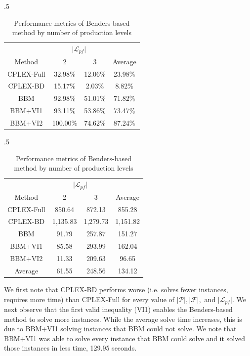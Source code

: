 \documentclass[12pt]{article}
\theoremstyle{thmstylethree}%
\begin{document}
\begin{table}[htp]
\begin{subtable}[c]{.5\textwidth}
\tiny
\centering
\begin{tabular}{|c|c|c|c|}
\hline
& \multicolumn{2}{c|}{$\vert \mathcal{L}_{pf} \vert$} &  \\
 Method & 2 & 3  & Average\\
 \hline
CPLEX-Full & 32.98\% & 12.06\% & 23.98\% \\
CPLEX-BD & 15.17\% & 2.03\% & 8.82\% \\
BBM & 92.98\% & 51.01\% & 71.82\% \\
BBM+VI1 & 93.11\% & 53.86\% & 73.47\% \\
BBM+VI2 & 100.00\% & 74.62\% & 87.24\% \\
\hline
\end{tabular}
\label{tbl:bd_pct_solved_byl}
\end{subtable}
\begin{subtable}[c]{.5\textwidth}
\center
\tiny
\begin{tabular}{|c|c|c|c|}
\hline
& \multicolumn{2}{c|}{$\vert \mathcal{L}_{pf} \vert$} &  \\
 Method & 2 & 3  & Average\\
 \hline
 CPLEX-Full &  850.64  &  872.13  &  855.28  \\
CPLEX-BD &  1,135.83  &  1,279.73  &  1,151.82  \\
BBM & 91.79  &  257.87  &  151.27  \\
 BBM+VI1 & 85.58  &  293.99  &  162.04  \\
 BBM+VI2 &11.33  &  209.63  &  96.65  \\
 \hline
 Average & 61.55  &  248.56  &  134.12  \\
\hline
\end{tabular}
\label{tbl:bd_solve_time_byl}
\end{subtable}
\caption{Performance metrics of Benders-based method by number of production levels}
\end{table}

We first note that CPLEX-BD performs worse (i.e. solves fewer instances, requires more time) than CPLEX-Full for every value of $\vert \mathcal{P} \vert, \vert \mathcal{F} \vert, $ and $\vert \mathcal{L}_{pf} \vert.$ We next observe that the first valid inequality (VI1) enables the Benders-based method to solve more instances. While the average solve time increases, this is due to BBM+VI1 solving instances that BBM could not solve. We note that BBM+VI1 was able to solve every instance that BBM could solve and it solved those instances in less time, 129.95 seconds. 
\end{document}
